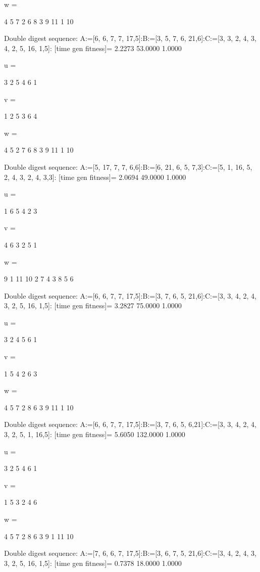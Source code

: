 w =

     4     5     7     2     6     8     3     9    11     1    10

Double digest sequence:
A:=[6, 6, 7, 7, 17,5]:B:=[3, 5, 7, 6, 21,6]:C:=[3, 3, 2, 4, 3, 4, 2, 5, 16, 1,5]:
[time gen fitness]=
    2.2273   53.0000    1.0000


u =

     3     2     5     4     6     1


v =

     1     2     5     3     6     4


w =

     4     5     2     7     6     8     3     9    11     1    10

Double digest sequence:
A:=[5, 17, 7, 7, 6,6]:B:=[6, 21, 6, 5, 7,3]:C:=[5, 1, 16, 5, 2, 4, 3, 2, 4, 3,3]:
[time gen fitness]=
    2.0694   49.0000    1.0000


u =

     1     6     5     4     2     3


v =

     4     6     3     2     5     1


w =

     9     1    11    10     2     7     4     3     8     5     6

Double digest sequence:
A:=[6, 6, 7, 7, 17,5]:B:=[3, 7, 6, 5, 21,6]:C:=[3, 3, 4, 2, 4, 3, 2, 5, 16, 1,5]:
[time gen fitness]=
    3.2827   75.0000    1.0000


u =

     3     2     4     5     6     1


v =

     1     5     4     2     6     3


w =

     4     5     7     2     8     6     3     9    11     1    10

Double digest sequence:
A:=[6, 6, 7, 7, 17,5]:B:=[3, 7, 6, 5, 6,21]:C:=[3, 3, 4, 2, 4, 3, 2, 5, 1, 16,5]:
[time gen fitness]=
    5.6050  132.0000    1.0000


u =

     3     2     5     4     6     1


v =

     1     5     3     2     4     6


w =

     4     5     7     2     8     6     3     9     1    11    10

Double digest sequence:
A:=[7, 6, 6, 7, 17,5]:B:=[3, 6, 7, 5, 21,6]:C:=[3, 4, 2, 4, 3, 3, 2, 5, 16, 1,5]:
[time gen fitness]=
    0.7378   18.0000    1.0000


